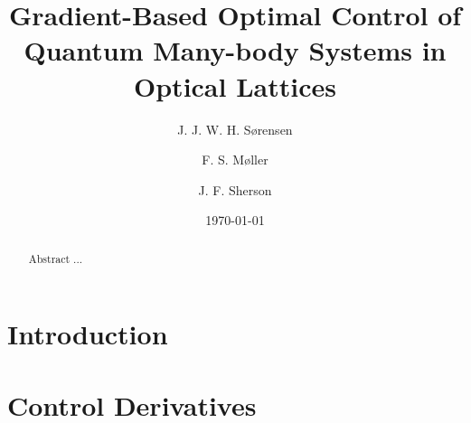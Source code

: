 \documentclass[%
 reprint,
 amsmath,amssymb,
 aps,
pra,
]{revtex4-1}
\begin{document}

\title{Gradient-Based Optimal Control of Quantum Many-body Systems in Optical Lattices}%

\author{J. J. W. H. S\o rensen}
\author{F. S. M\o ller}
\author{J. F. Sherson}
\date{\today}%

\begin{abstract}
Abstract ...


\end{abstract}

\maketitle

\section{Introduction}

\section{Control Derivatives}
\end{document}
